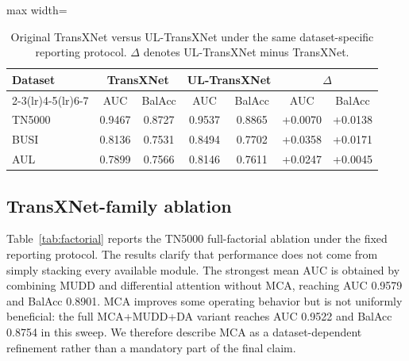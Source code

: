 \documentclass[preprint,12pt]{elsarticle}
\begin{document}
\begin{table}[!htbp]
    \centering
    \small
    \caption{Original TransXNet versus UL-TransXNet under the same dataset-specific reporting protocol. $\Delta$ denotes UL-TransXNet minus TransXNet.}
    \label{tab:original_transxnet_delta}
    \begin{adjustbox}{max width=\columnwidth}
    \begin{tabular}{lcccccc}
        \toprule
        Dataset & \multicolumn{2}{c}{TransXNet} & \multicolumn{2}{c}{UL-TransXNet} & \multicolumn{2}{c}{$\Delta$} \\
        \cmidrule(lr){2-3}\cmidrule(lr){4-5}\cmidrule(lr){6-7}
        & AUC & BalAcc & AUC & BalAcc & AUC & BalAcc \\
        \midrule
        TN5000 & 0.9467 & 0.8727 & 0.9537 & 0.8865 & +0.0070 & +0.0138 \\
        BUSI & 0.8136 & 0.7531 & 0.8494 & 0.7702 & +0.0358 & +0.0171 \\
        AUL & 0.7899 & 0.7566 & 0.8146 & 0.7611 & +0.0247 & +0.0045 \\
        \bottomrule
    \end{tabular}
    \end{adjustbox}
\end{table}

\subsection{TransXNet-family ablation}

Table~\ref{tab:factorial} reports the TN5000 full-factorial ablation under the fixed reporting protocol. The results clarify that performance does not come from simply stacking every available module. The strongest mean AUC is obtained by combining MUDD and differential attention without MCA, reaching AUC 0.9579 and BalAcc 0.8901. MCA improves some operating behavior but is not uniformly beneficial: the full MCA+MUDD+DA variant reaches AUC 0.9522 and BalAcc 0.8754 in this sweep. We therefore describe MCA as a dataset-dependent refinement rather than a mandatory part of the final claim.
\end{document}
